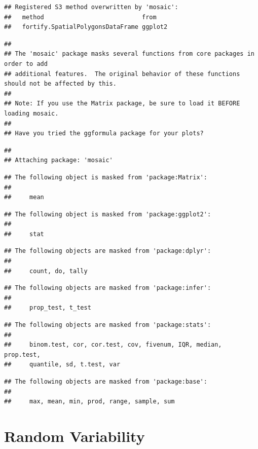 \documentclass[
]{book}
\begin{document}
\begin{verbatim}
## Registered S3 method overwritten by 'mosaic':
##   method                           from   
##   fortify.SpatialPolygonsDataFrame ggplot2
\end{verbatim}

\begin{verbatim}
## 
## The 'mosaic' package masks several functions from core packages in order to add 
## additional features.  The original behavior of these functions should not be affected by this.
## 
## Note: If you use the Matrix package, be sure to load it BEFORE loading mosaic.
## 
## Have you tried the ggformula package for your plots?
\end{verbatim}

\begin{verbatim}
## 
## Attaching package: 'mosaic'
\end{verbatim}

\begin{verbatim}
## The following object is masked from 'package:Matrix':
## 
##     mean
\end{verbatim}

\begin{verbatim}
## The following object is masked from 'package:ggplot2':
## 
##     stat
\end{verbatim}

\begin{verbatim}
## The following objects are masked from 'package:dplyr':
## 
##     count, do, tally
\end{verbatim}

\begin{verbatim}
## The following objects are masked from 'package:infer':
## 
##     prop_test, t_test
\end{verbatim}

\begin{verbatim}
## The following objects are masked from 'package:stats':
## 
##     binom.test, cor, cor.test, cov, fivenum, IQR, median, prop.test,
##     quantile, sd, t.test, var
\end{verbatim}

\begin{verbatim}
## The following objects are masked from 'package:base':
## 
##     max, mean, min, prod, range, sample, sum
\end{verbatim}

\hypertarget{randvariability}{%
\chapter{Random Variability}\label{randvariability}}
\end{document}
